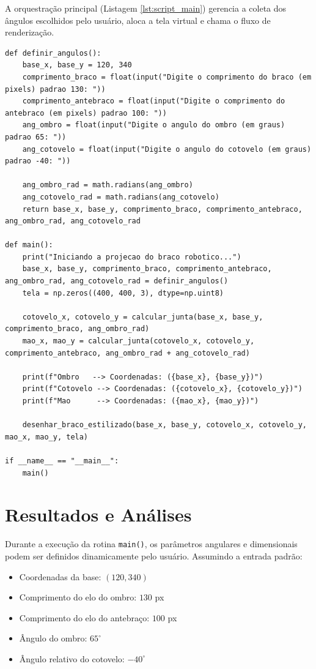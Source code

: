 \documentclass{article}
\begin{document}
A orquestração principal (Listagem \ref{lst:script_main}) gerencia a coleta dos ângulos escolhidos pelo usuário, aloca a tela virtual e chama o fluxo de renderização.

\begin{lstlisting}[style=pythonstyle, caption={Rotina principal de execução e coleta de dados}, label={lst:script_main}]
def definir_angulos():
    base_x, base_y = 120, 340
    comprimento_braco = float(input("Digite o comprimento do braco (em pixels) padrao 130: "))
    comprimento_antebraco = float(input("Digite o comprimento do antebraco (em pixels) padrao 100: "))
    ang_ombro = float(input("Digite o angulo do ombro (em graus) padrao 65: "))
    ang_cotovelo = float(input("Digite o angulo do cotovelo (em graus) padrao -40: "))

    ang_ombro_rad = math.radians(ang_ombro)
    ang_cotovelo_rad = math.radians(ang_cotovelo)
    return base_x, base_y, comprimento_braco, comprimento_antebraco, ang_ombro_rad, ang_cotovelo_rad

def main():
    print("Iniciando a projecao do braco robotico...")
    base_x, base_y, comprimento_braco, comprimento_antebraco, ang_ombro_rad, ang_cotovelo_rad = definir_angulos()
    tela = np.zeros((400, 400, 3), dtype=np.uint8)

    cotovelo_x, cotovelo_y = calcular_junta(base_x, base_y, comprimento_braco, ang_ombro_rad)
    mao_x, mao_y = calcular_junta(cotovelo_x, cotovelo_y, comprimento_antebraco, ang_ombro_rad + ang_cotovelo_rad)

    print(f"Ombro   --> Coordenadas: ({base_x}, {base_y})")
    print(f"Cotovelo --> Coordenadas: ({cotovelo_x}, {cotovelo_y})")
    print(f"Mao      --> Coordenadas: ({mao_x}, {mao_y})")

    desenhar_braco_estilizado(base_x, base_y, cotovelo_x, cotovelo_y, mao_x, mao_y, tela)

if __name__ == "__main__":
    main()
\end{lstlisting}

\section{Resultados e Análises}

Durante a execução da rotina \texttt{main()}, os parâmetros angulares e dimensionais podem ser definidos dinamicamente pelo usuário. Assumindo a entrada padrão:
\begin{itemize}
    \item Coordenadas da base: $(120, 340)$
    \item Comprimento do elo do ombro: $130$ px
    \item Comprimento do elo do antebraço: $100$ px
    \item Ângulo do ombro: $65^\circ$
    \item Ângulo relativo do cotovelo: $-40^\circ$
\end{itemize}
\end{document}
